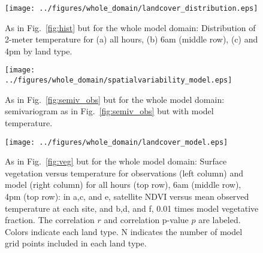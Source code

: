 \documentclass[draft,linenumbers]{agujournal}
\begin{document}


\begin{figure}[h]
\centering
\texttt{[image: ../figures/whole\_domain/landcover\_distribution.eps]}
\caption{As in Fig.~\ref{fig:hist}  but for the whole model domain: Distribution of 2-meter temperature for (a) all hours, (b) 6am (middle row), (c) and 4pm by land type. }
\label{fig:hist_wd}
\end{figure}

\begin{figure}[h]
\centering
\texttt{[image: ../figures/whole\_domain/spatialvariability\_model.eps]}
\caption{As in Fig.~\ref{fig:semiv_obs} but for the whole model domain: semivariogram as in Fig.~\ref{fig:semiv_obs} but with model temperature.}
\label{fig:semiv_model_wd}
\end{figure}

\begin{figure}[h]
\centering
\texttt{[image: ../figures/whole\_domain/landcover\_model.eps]}
\caption{As in Fig.~\ref{fig:veg} but for the whole model domain:  Surface vegetation versus temperature for observations (left column) and model (right column) for all hours (top row), 6am (middle row), 4pm (top row): in a,c, and e, satellite NDVI versus mean observed temperature at each site, and b,d, and f, 0.01 times model vegetative fraction. The correlation $r$ and correlation p-value $p$ are labeled. Colors indicate each land type. N indicates the number of model grid points included in each land type.}
\label{fig:veg_wd}
\end{figure}
\end{document}
